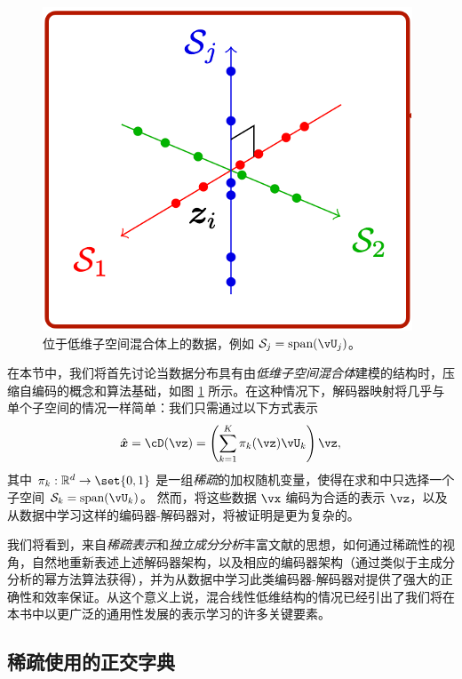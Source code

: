 \documentclass[../../book-main.tex]{subfiles}
\begin{document}
\begin{figure}
    \centering
    \includegraphics[height=0.35\linewidth]{chapters/subspaces.png}
    \caption{位于低维子空间混合体上的数据，例如 $\mathcal{S}_j = \mbox{span}(\vU_j)$。}
    \label{fig:subspaces}
\end{figure}

在本节中，我们将首先讨论当数据分布具有由\textit{低维子空间混合体}建模的结构时，压缩自编码的概念和算法基础，如图 \ref{fig:subspaces} 所示。在这种情况下，解码器映射将几乎与单个子空间的情况一样简单：我们只需通过以下方式表示
\begin{equation}\label{eq:mixture-subspaces-decoder-first-cut}
    \hat{\x} = \cD(\vz) = \left( \sum_{k=1}^K \pi_k(\vz)\vU_k \right) \vz,
\end{equation}
其中 $\pi_k : \R^d \to \set{0,1}$ 是一组\textit{稀疏}的加权随机变量，使得在求和中只选择一个子空间 $\mathcal{S}_k = \mbox{span}(\vU_k)$。
然而，将这些数据 $\vx$ 编码为合适的表示 $\vz$，以及从数据中学习这样的编码器-解码器对，将被证明是更为复杂的。

我们将看到，来自\textit{稀疏表示}和\textit{独立成分分析}丰富文献的思想，如何通过稀疏性的视角，自然地重新表述上述解码器架构，以及相应的编码器架构（通过类似于主成分分析的幂方法算法获得），并为从数据中学习此类编码器-解码器对提供了强大的正确性和效率保证。从这个意义上说，混合线性低维结构的情况已经引出了我们将在本书中以更广泛的通用性发展的表示学习的许多关键要素。


\subsection{稀疏使用的正交字典}

\end{document}
